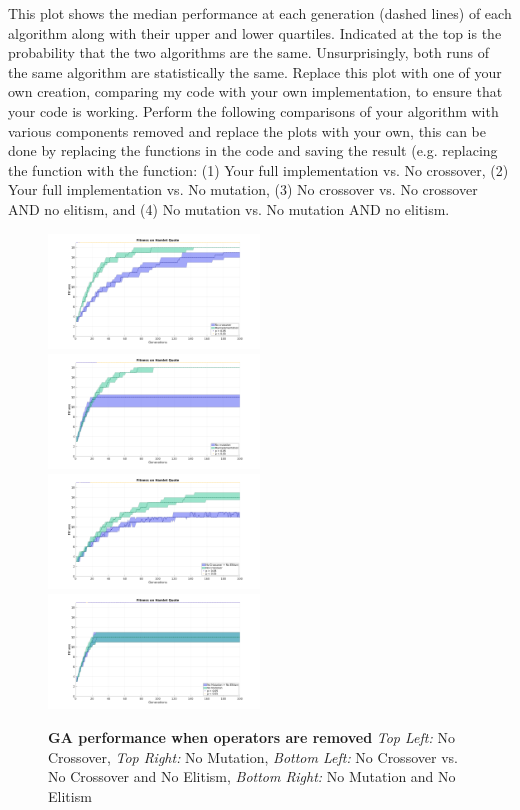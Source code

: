 \documentclass{article}
\begin{document}
	This plot shows the median performance at each generation (dashed lines) of each algorithm along with their upper and lower quartiles. Indicated at the top is the probability that the two algorithms are the same. Unsurprisingly, both runs of the same algorithm are statistically the same. Replace this plot with one of your own creation, comparing my code with your own implementation, to ensure that your code is working.
\newpage
	Perform the following comparisons of your algorithm with various components removed and replace the plots with your own, this can be done by replacing the functions in the code and saving the result (e.g. replacing the  function with the  function: (1) Your full implementation vs. No crossover, (2) Your full implementation vs. No mutation, (3) No crossover vs. No crossover AND no elitism, and (4) No mutation  vs. No mutation AND no elitism.

		\begin{figure}[h!]
		\includegraphics[width=0.5\textwidth]{img/My_vs_NoCross.png}
		\includegraphics[width=0.5\textwidth]{img/My_vs_NoMut.png}
		\includegraphics[width=0.5\textwidth]{img/My_NoCross_vs_NoCrossNoElite.png}
		\includegraphics[width=0.5\textwidth]{img/My_NoMut_vs_NoMutNoElite.png}
		\caption
		{
		\textbf{GA performance when operators are removed}\newline
		\textit{Top Left:} No Crossover,
		\textit{Top Right:} No Mutation, 
		\textit{Bottom Left:} No Crossover vs. No Crossover and No Elitism, 
		\textit{Bottom Right:} No Mutation and No Elitism
		}
		\end{figure}
\newpage
\end{document}
